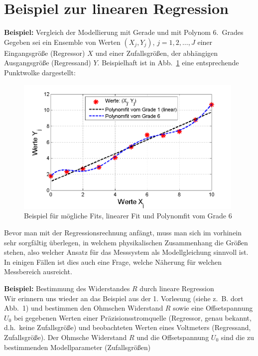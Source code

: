 \section{Beispiel zur linearen Regression}
\label{subsection:lineare-Regression}
\textbf{Beispiel:} Vergleich der Modellierung mit Gerade und mit Polynom 6.~Grades \\
Gegeben sei ein Ensemble von Werten
$(X_j,Y_j )$, $j = 1,2,\ldots ,J$ einer Eingangsgröße (Regressor) $X$ und einer Zufallsgrößen,
der abhängigen Ausgangsgröße (Regressand) $Y$.
Beispielhaft ist in Abb.~\ref{fig:LineareRegressionMoeglFits} eine
entsprechende Punktwolke dargestellt:
\begin{figure}[!htbp]
	\centering
	\includegraphics[width=11cm]{02_vorlesung/media/Regression_der_WertePaare.png}
    \caption{Beispiel für mögliche Fits, linearer Fit und Polynomfit vom Grade 6} \label{fig:LineareRegressionMoeglFits}
\end{figure}
Bevor man mit der Regressionsrechnung anfängt, muss man sich im vorhinein sehr sorgfältig
überlegen, in welchem physikalischen Zusammenhang die Größen stehen, also welcher
Ansatz für das Messsystem als Modellgleichung sinnvoll ist.
In einigen Fällen ist dies auch eine Frage, welche Näherung für welchen Messbereich
ausreicht. 

\textbf{Beispiel:} Bestimmung des Widerstandes $R$ durch lineare Regression \\
Wir erinnern uns wieder an das Beispiel aus der 1. Vorlesung (siehe z.~B. dort Abb.~1) und bestimmen den Ohmschen Widerstand $R$ sowie eine Offsetspannung $U_0$ bei gegebenen Werten einer
Präzisions\-strom\-quelle (Regressor, genau bekannt, d.h.\ keine Zufallsgröße) und beobachteten
Werten eines Voltmeters (Regressand, Zufallsgröße). 
Der Ohmsche Widerstand $R$ und die Offsetspannung $U_0$ sind die zu bestimmenden Modellparameter (Zufallsgrößen)

